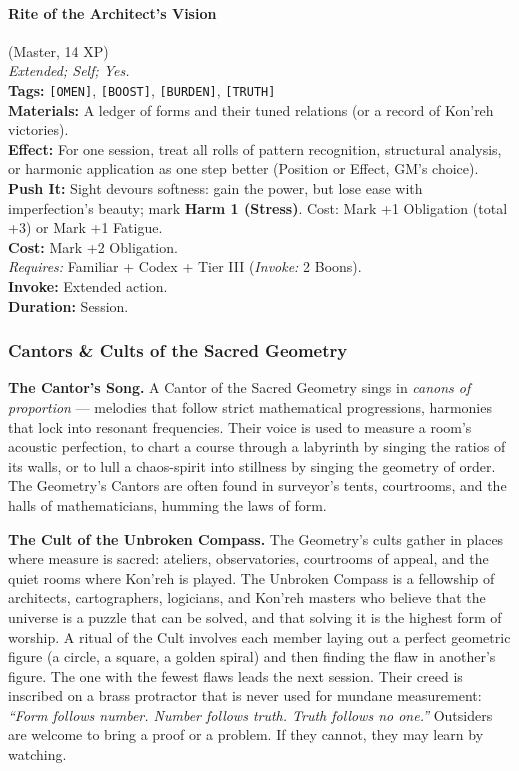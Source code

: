 \paragraph{Rite of the Architect's Vision} (Master, 14 XP) \hfill \\
\emph{Extended; Self; Yes.} \\
\textbf{Tags:} \texttt{[OMEN]}, \texttt{[BOOST]}, \texttt{[BURDEN]}, \texttt{[TRUTH]} \\
\textbf{Materials:} A ledger of forms and their tuned relations (or a record of Kon'reh victories). \\
\textbf{Effect:} For one session, treat all rolls of pattern recognition, structural analysis, or harmonic application as one step better (Position or Effect, GM's choice). \\
\textbf{Push It:} Sight devours softness: gain the power, but lose ease with imperfection's beauty; mark \textbf{Harm 1 (Stress)}. Cost: Mark +1 Obligation (total +3) or Mark +1 Fatigue. \\
\textbf{Cost:} Mark +2 Obligation. \\
\textit{Requires:} Familiar + Codex + Tier III (\textit{Invoke:} 2 Boons). \\
\textbf{Invoke:} Extended action. \\
\textbf{Duration:} Session.

\subsubsection*{Cantors \& Cults of the Sacred Geometry}

\textbf{The Cantor's Song.} A Cantor of the Sacred Geometry sings in \textit{canons of proportion} --- melodies that follow strict mathematical progressions, harmonies that lock into resonant frequencies. Their voice is used to measure a room's acoustic perfection, to chart a course through a labyrinth by singing the ratios of its walls, or to lull a chaos-spirit into stillness by singing the geometry of order. The Geometry's Cantors are often found in surveyor's tents, courtrooms, and the halls of mathematicians, humming the laws of form.

\textbf{The Cult of the Unbroken Compass.} The Geometry's cults gather in places where measure is sacred: ateliers, observatories, courtrooms of appeal, and the quiet rooms where Kon'reh is played. The Unbroken Compass is a fellowship of architects, cartographers, logicians, and Kon'reh masters who believe that the universe is a puzzle that can be solved, and that solving it is the highest form of worship. A ritual of the Cult involves each member laying out a perfect geometric figure (a circle, a square, a golden spiral) and then finding the flaw in another's figure. The one with the fewest flaws leads the next session. Their creed is inscribed on a brass protractor that is never used for mundane measurement: \textit{``Form follows number. Number follows truth. Truth follows no one.''} Outsiders are welcome to bring a proof or a problem. If they cannot, they may learn by watching.

